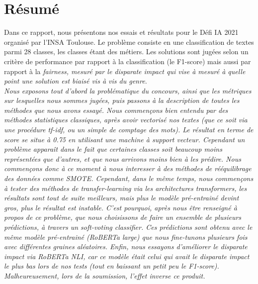 \chapter{Résumé}

Dans ce rapport, nous présentons nos essais et résultats pour le Défi IA 2021 organisé par l'INSA Toulouse. Le problème consiste en une classification de textes parmi 28 classes, les classes étant des métiers. Les solutions sont jugées selon un critère de performance par rapport à la classification (le F1-score) mais aussi par rapport à la \it{fairness}, mesuré par le \it{disparate impact} qui vise à mesuré à quelle point une solution est biaisé vis à vis du genre. \\
Nous exposons tout d'abord la problématique du concours, ainsi que les métriques sur lesquelles nous sommes jugées, puis passons à la description de toutes les méthodes que nous avons essayé. Nous commençons bien entendu par des méthodes statistiques classiques, après avoir  vectorisé nos textes (que ce soit via une procédure tf-idf, ou un simple de comptage des mots). Le résultat en terme de score se situe à 0.75 en utilisant une machine à support vecteur. Cependant un problème apparaît dans le fait que certaines classes soit beaucoup moins représentées que d'autres, et que nous arrivons moins bien à les prédire. Nous commençons donc à ce moment à nous interesser à des méthodes de rééquilibrage des données comme SMOTE. Cependant, dans le même temps, nous commençons à tester des méthodes de transfer-learning via les architectures transformers, les résultats sont tout de suite meilleurs, mais plus le modèle pré-entrainé devint gros, plus le résultat est instable. C'est pourquoi, après nous être renseigné à propos de ce problème, que nous choisissons de faire un ensemble de plusieurs prédictions, à travers un soft-voting classifier. Ces prédictions sont obtenu avec le même modèle pré-entrainé (RoBERTa large) que nous fine-tunons plusieurs fois avec différentes graines aléatoires. Enfin, nous essayons d'améliorer le disparate impact via  RoBERTa NLI, car ce modèle était celui qui avait le disparate impact le plus bas lors de nos tests (tout en baissant un petit peu le F1-score). Malheureusement, lors de la soumission, l'effet inverse ce produit.


